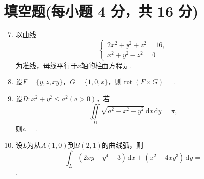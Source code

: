 \documentclass[../Main.tex]{subfiles}
\begin{document}
\section{填空题(每小题 4 分，共 16 分)}
\begin{enumerate}
  \setcounter{enumi}{6}
  \item 以曲线
        \[
          \begin{cases}
            2x^{2}+y^{2}+z^{2}=16, \\
            x^{2}+y^{2}-z^{2}=0
          \end{cases}
        \]
        为准线，母线平行于$x$轴的柱面方程是\underline{\hspace{4cm}}.

  \item 设$F=\{y,z,xy\}$，$G=\{1,0,x\}$，则$\operatorname{rot}(F\times G)=$\underline{\hspace{3cm}}.

  \item 设$D:x^{2}+y^{2}\leq a^{2}(a>0)$，若
        \[
          \iint\limits_{D}\sqrt{a^{2}-x^{2}-y^{2}}\,\mathrm{d}x\,\mathrm{d}y=\pi,
        \]
        则$a=$\underline{\hspace{3cm}}.

  \item 设$L$为从$A(1,0)$到$B(2,1)$的曲线弧，则
        \[
          \int_{L}(2xy-y^{4}+3)\,\mathrm{d}x+(x^{2}-4xy^{3})\,\mathrm{d}y=
        \]
        \underline{\hspace{3cm}}.
\end{enumerate}
\end{document}
